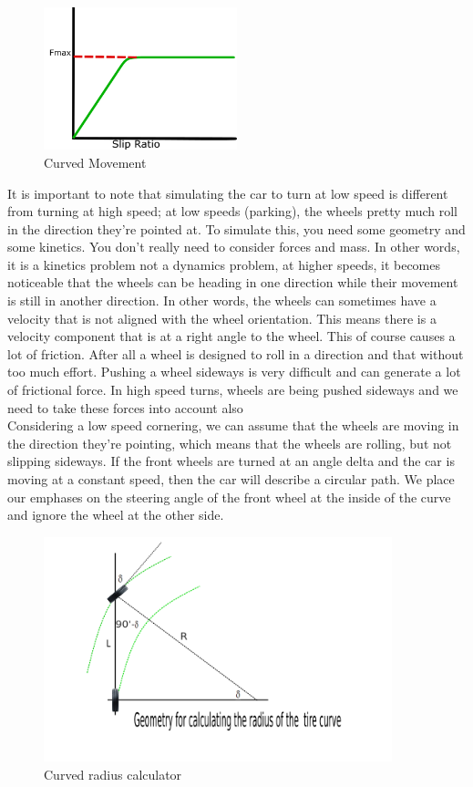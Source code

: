 \documentclass{book}
\begin{document}
\begin{figure}
\centering
  \includegraphics[width=0.5\textwidth]{text3784}
 \caption{Curved Movement}
  \label{fig:CurvedMovement}
\end{figure}

It is important to note that simulating the car to turn at low speed is different from turning at high speed; at low speeds (parking), the wheels pretty much roll in the direction they're pointed at. To simulate this, you need some geometry and some kinetics. You don't really need to consider forces and mass. In other words, it is a kinetics problem not a dynamics problem, at higher speeds, it becomes noticeable that the wheels can be heading in one direction while their movement is still in another direction. In other words, the wheels can sometimes have a velocity that is not aligned with the wheel orientation. This means there is a velocity component that is at a right angle to the wheel. This of course causes a lot of friction. After all a wheel is designed to roll in a direction and that without too much effort. Pushing a wheel sideways is very difficult and can generate a lot of frictional force. In high speed turns, wheels are being pushed sideways and we need to take these forces into account also\\
Considering a low speed cornering, we can assume that the wheels are moving in the direction they're pointing, which means that the wheels are rolling, but not slipping sideways.  If the front wheels are turned at an angle delta and the car is moving at a constant speed, then the car will describe a circular path.  We place our emphases on the steering angle of the front wheel at the inside of the curve and ignore the wheel at the other side.
\begin{figure}[htbp]
  \centering
  \includegraphics[width=0.9\textwidth]{radiusofacurve}
  \caption{Curved radius calculator}
  \label{fig:curvedradius}
\end{figure}
\end{document}
